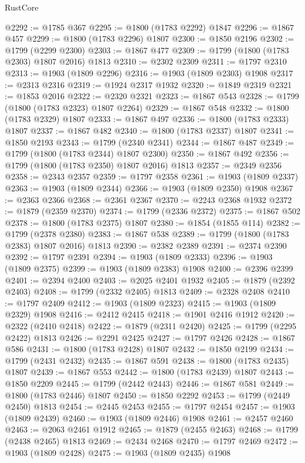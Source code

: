 \begin{lexlean}{RustCore}
\begin{coremodule}
@2292 := @1785 @367
@2295 := @1800 (@1783 @2292) @1847
@2296 := @1867 @457
@2299 := @1800 (@1783 @2296) @1807
@2300 := @1850 @2196
@2302 := @1799 (@2299 @2300)
@2303 := @1867 @477
@2309 := @1799 (@1800 (@1783 @2303) @1807 @2016) @1813
@2310 := @2302 @2309
@2311 := @1797 @2310
@2313 := @1903 (@1809 @2296)
@2316 := @1903 (@1809 @2303) @1908
@2317 := @2313 @2316
@2319 := @1924 @2317 @1932
@2320 := @1849 @2319
@2321 := @1853 @2016
@2322 := @2320 @2321
@2323 := @1867 @543
@2328 := @1799 (@1800 (@1783 @2323) @1807 @2264)
@2329 := @1867 @548
@2332 := @1800 (@1783 @2329) @1807
@2333 := @1867 @497
@2336 := @1800 (@1783 @2333) @1807
@2337 := @1867 @482
@2340 := @1800 (@1783 @2337) @1807
@2341 := @1850 @2193
@2343 := @1799 (@2340 @2341)
@2344 := @1867 @487
@2349 := @1799 (@1800 (@1783 @2344) @1807 @2300)
@2350 := @1867 @492
@2356 := @1799 (@1800 (@1783 @2350) @1807 @2016) @1813
@2357 := @2349 @2356
@2358 := @2343 @2357
@2359 := @1797 @2358
@2361 := @1903 (@1809 @2337)
@2363 := @1903 (@1809 @2344)
@2366 := @1903 (@1809 @2350) @1908
@2367 := @2363 @2366
@2368 := @2361 @2367
@2370 := @2243 @2368 @1932
@2372 := @1879 (@2359 @2370)
@2374 := @1799 (@2336 @2372)
@2375 := @1867 @502
@2378 := @1800 (@1783 @2375) @1807
@2380 := @1854 (@1855 @114)
@2382 := @1799 (@2378 @2380)
@2383 := @1867 @538
@2389 := @1799 (@1800 (@1783 @2383) @1807 @2016) @1813
@2390 := @2382 @2389
@2391 := @2374 @2390
@2392 := @1797 @2391
@2394 := @1903 (@1809 @2333)
@2396 := @1903 (@1809 @2375)
@2399 := @1903 (@1809 @2383) @1908
@2400 := @2396 @2399
@2401 := @2394 @2400
@2403 := @2025 @2401 @1932
@2405 := @1879 (@2392 @2403)
@2408 := @1799 (@2332 @2405) @1813
@2409 := @2328 @2408
@2410 := @1797 @2409
@2412 := @1903 (@1809 @2323)
@2415 := @1903 (@1809 @2329) @1908
@2416 := @2412 @2415
@2418 := @1901 @2416 @1912
@2420 := @2322 (@2410 @2418)
@2422 := @1879 (@2311 @2420)
@2425 := @1799 (@2295 @2422) @1813
@2426 := @2291 @2425
@2427 := @1797 @2426
@2428 := @1867 @586
@2431 := @1800 (@1783 @2428) @1807
@2432 := @1850 @2199
@2434 := @1799 (@2431 @2432)
@2435 := @1867 @591
@2438 := @1800 (@1783 @2435) @1807
@2439 := @1867 @553
@2442 := @1800 (@1783 @2439) @1807
@2443 := @1850 @2209
@2445 := @1799 (@2442 @2443)
@2446 := @1867 @581
@2449 := @1800 (@1783 @2446) @1807
@2450 := @1850 @2292
@2453 := @1799 (@2449 @2450) @1813
@2454 := @2445 @2453
@2455 := @1797 @2454
@2457 := @1903 (@1809 @2439)
@2460 := @1903 (@1809 @2446) @1908
@2461 := @2457 @2460
@2463 := @2063 @2461 @1912
@2465 := @1879 (@2455 @2463)
@2468 := @1799 (@2438 @2465) @1813
@2469 := @2434 @2468
@2470 := @1797 @2469
@2472 := @1903 (@1809 @2428)
@2475 := @1903 (@1809 @2435) @1908

\end{coremodule}
\end{lexlean}
